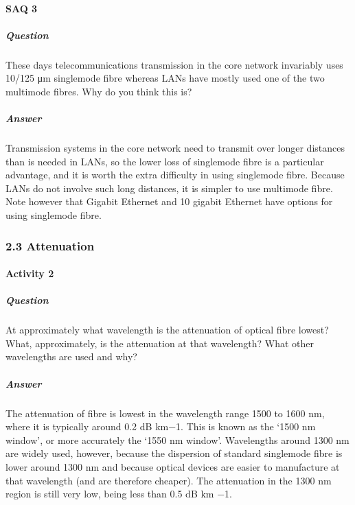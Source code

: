 \documentclass[letterpaper,10pt,english]{sphinxmanual}
\begin{document}
\paragraph{SAQ 3}
\label{\detokenize{content/session_00/Part_00_02:SAQ-3}}

\subparagraph{Question}
\label{\detokenize{content/session_00/Part_00_02:id3}}
These days telecommunications transmission in the core network invariably uses 10/125 μm single\sphinxhyphen{}mode fibre whereas LANs have mostly used one of the two multimode fibres. Why do you think this is?


\subparagraph{Answer}
\label{\detokenize{content/session_00/Part_00_02:id4}}
Transmission systems in the core network need to transmit over longer distances than is needed in LANs, so the lower loss of single\sphinxhyphen{}mode fibre is a particular advantage, and it is worth the extra difficulty in using single\sphinxhyphen{}mode fibre. Because LANs do not involve such long distances, it is simpler to use multimode fibre. Note however that Gigabit Ethernet and 10 gigabit Ethernet have options for using single\sphinxhyphen{}mode fibre.


\subsubsection{2.3 Attenuation}
\label{\detokenize{content/session_00/Part_00_02:2.3-Attenuation}}

\paragraph{Activity 2}
\label{\detokenize{content/session_00/Part_00_02:Activity-2}}

\subparagraph{Question}
\label{\detokenize{content/session_00/Part_00_02:id5}}
At approximately what wavelength is the attenuation of optical fibre lowest? What, approximately, is the attenuation at that wavelength? What other wavelengths are used and why?


\subparagraph{Answer}
\label{\detokenize{content/session_00/Part_00_02:id6}}
The attenuation of fibre is lowest in the wavelength range 1500 to 1600 nm, where it is typically around 0.2 dB km−1. This is known as the ‘1500 nm window’, or more accurately the ‘1550 nm window’. Wavelengths around 1300 nm are widely used, however, because the dispersion of standard single\sphinxhyphen{}mode fibre is lower around 1300 nm and because optical devices are easier to manufacture at that wavelength (and are therefore cheaper). The attenuation in the 1300 nm region is still very low, being less
than 0.5 dB km −1.
\end{document}
